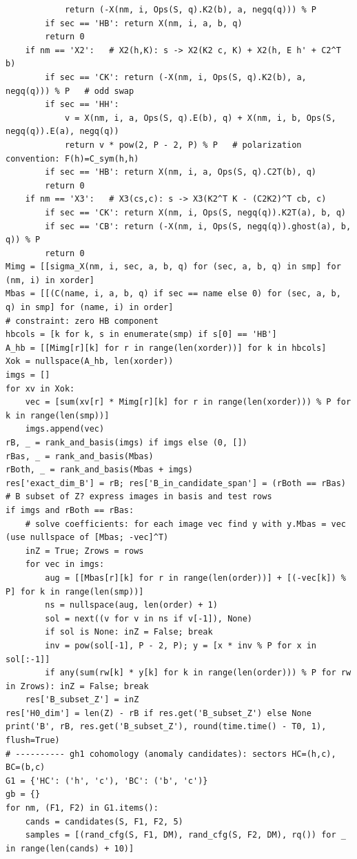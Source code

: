 \documentclass[10pt]{article}
\begin{document}
\begin{lstlisting}
            return (-X(nm, i, Ops(S, q).K2(b), a, negq(q))) % P
        if sec == 'HB': return X(nm, i, a, b, q)
        return 0
    if nm == 'X2':   # X2(h,K): s -> X2(K2 c, K) + X2(h, E h' + C2^T b)
        if sec == 'CK': return (-X(nm, i, Ops(S, q).K2(b), a, negq(q))) % P   # odd swap
        if sec == 'HH':
            v = X(nm, i, a, Ops(S, q).E(b), q) + X(nm, i, b, Ops(S, negq(q)).E(a), negq(q))
            return v * pow(2, P - 2, P) % P   # polarization convention: F(h)=C_sym(h,h)
        if sec == 'HB': return X(nm, i, a, Ops(S, q).C2T(b), q)
        return 0
    if nm == 'X3':   # X3(cs,c): s -> X3(K2^T K - (C2K2)^T cb, c)
        if sec == 'CK': return X(nm, i, Ops(S, negq(q)).K2T(a), b, q)
        if sec == 'CB': return (-X(nm, i, Ops(S, negq(q)).ghost(a), b, q)) % P
        return 0
Mimg = [[sigma_X(nm, i, sec, a, b, q) for (sec, a, b, q) in smp] for (nm, i) in xorder]
Mbas = [[(C(name, i, a, b, q) if sec == name else 0) for (sec, a, b, q) in smp] for (name, i) in order]
# constraint: zero HB component
hbcols = [k for k, s in enumerate(smp) if s[0] == 'HB']
A_hb = [[Mimg[r][k] for r in range(len(xorder))] for k in hbcols]
Xok = nullspace(A_hb, len(xorder))
imgs = []
for xv in Xok:
    vec = [sum(xv[r] * Mimg[r][k] for r in range(len(xorder))) % P for k in range(len(smp))]
    imgs.append(vec)
rB, _ = rank_and_basis(imgs) if imgs else (0, [])
rBas, _ = rank_and_basis(Mbas)
rBoth, _ = rank_and_basis(Mbas + imgs)
res['exact_dim_B'] = rB; res['B_in_candidate_span'] = (rBoth == rBas)
# B subset of Z? express images in basis and test rows
if imgs and rBoth == rBas:
    # solve coefficients: for each image vec find y with y.Mbas = vec  (use nullspace of [Mbas; -vec]^T)
    inZ = True; Zrows = rows
    for vec in imgs:
        aug = [[Mbas[r][k] for r in range(len(order))] + [(-vec[k]) % P] for k in range(len(smp))]
        ns = nullspace(aug, len(order) + 1)
        sol = next((v for v in ns if v[-1]), None)
        if sol is None: inZ = False; break
        inv = pow(sol[-1], P - 2, P); y = [x * inv % P for x in sol[:-1]]
        if any(sum(rw[k] * y[k] for k in range(len(order))) % P for rw in Zrows): inZ = False; break
    res['B_subset_Z'] = inZ
res['H0_dim'] = len(Z) - rB if res.get('B_subset_Z') else None
print('B', rB, res.get('B_subset_Z'), round(time.time() - T0, 1), flush=True)
# ---------- gh1 cohomology (anomaly candidates): sectors HC=(h,c), BC=(b,c)
G1 = {'HC': ('h', 'c'), 'BC': ('b', 'c')}
gb = {}
for nm, (F1, F2) in G1.items():
    cands = candidates(S, F1, F2, 5)
    samples = [(rand_cfg(S, F1, DM), rand_cfg(S, F2, DM), rq()) for _ in range(len(cands) + 10)]

\end{lstlisting}
\end{document}
